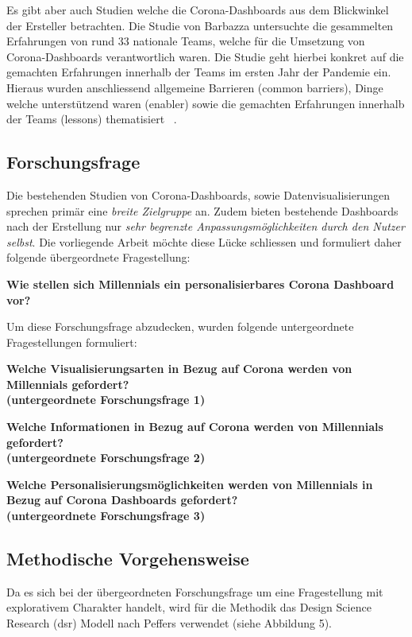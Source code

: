 \documentclass[12pt, oneside]{article}
\begin{document}
Es gibt aber auch Studien welche die Corona-Dashboards aus dem Blickwinkel der Ersteller betrachten. Die Studie von Barbazza untersuchte die gesammelten Erfahrungen von rund 33 nationale Teams, welche für die Umsetzung von Corona-Dashboards verantwortlich waren. Die Studie geht hierbei konkret auf die gemachten Erfahrungen innerhalb der Teams im ersten Jahr der Pandemie ein. Hieraus wurden anschliessend allgemeine Barrieren (common barriers), Dinge welche unterstützend waren (enabler) sowie die gemachten Erfahrungen innerhalb der Teams (lessons) thematisiert ~\citep{Barbazza.}.

\subsection{Forschungsfrage}
Die bestehenden Studien von Corona-Dashboards, sowie Datenvisualisierungen sprechen primär eine \textit{breite Zielgruppe} an. Zudem bieten bestehende Dashboards nach der Erstellung nur \textit{sehr begrenzte Anpassungsmöglichkeiten durch den Nutzer selbst}. Die vorliegende Arbeit möchte diese Lücke schliessen und formuliert daher folgende übergeordnete Fragestellung:

\begin{center}
\textbf{Wie stellen sich Millennials ein personalisierbares Corona Dashboard vor?}
\end{center}

Um diese Forschungsfrage abzudecken, wurden folgende untergeordnete Fragestellungen formuliert:

\begin{center}
\textbf{Welche Visualisierungsarten in Bezug auf Corona werden von Millennials gefordert?\\
(untergeordnete Forschungsfrage 1)}
\end{center}

\begin{center}
\textbf{Welche Informationen in Bezug auf Corona werden von Millennials gefordert?\\
(untergeordnete Forschungsfrage 2)}
\end{center}

\begin{center}
\textbf{Welche Personalisierungsmöglichkeiten werden von Millennials in Bezug auf Corona Dashboards gefordert?\\
(untergeordnete Forschungsfrage 3)}
\end{center}

\subsection{Methodische Vorgehensweise}
Da es sich bei der übergeordneten Forschungsfrage um eine Fragestellung mit explorativem Charakter handelt, wird für die Methodik das Design Science Research (\Gls{dsr}) Modell nach Peffers verwendet (siehe Abbildung 5).
\end{document}
